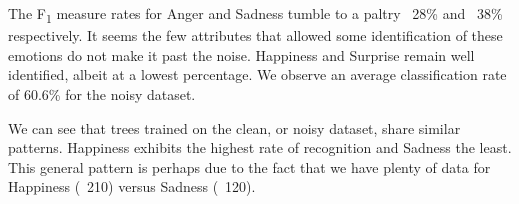 

The F\textsubscript{1} measure rates for Anger and Sadness tumble to a paltry ~28\% and ~38\% respectively.
It seems the few attributes that allowed some identification of these emotions do not make it past the noise.
Happiness and Surprise remain well identified, albeit at a lowest percentage.
We observe an average classification rate of 60.6\% for the noisy dataset.


We can see that trees trained on the clean, or noisy dataset, share similar patterns.
Happiness exhibits the highest rate of recognition and Sadness the least.
This general pattern is perhaps due to the fact that we have plenty of data for Happiness (~210) versus Sadness (~120).



